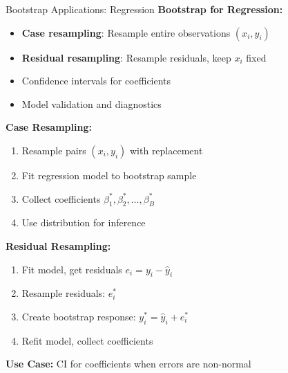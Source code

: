 \documentclass[aspectratio=169]{beamer}
\begin{document}
\begin{frame}{Bootstrap Applications: Regression}
\footnotesize
\textbf{Bootstrap for Regression:}
\begin{itemize}
    \item \textbf{Case resampling}: Resample entire observations $(x_i, y_i)$
    \item \textbf{Residual resampling}: Resample residuals, keep $x_i$ fixed
    \item Confidence intervals for coefficients
    \item Model validation and diagnostics
\end{itemize}

\vspace{0.1cm}
\textbf{Case Resampling:}
\begin{enumerate}
    \item Resample pairs $(x_i, y_i)$ with replacement
    \item Fit regression model to bootstrap sample
    \item Collect coefficients $\beta^*_1, \beta^*_2, \ldots, \beta^*_B$
    \item Use distribution for inference
\end{enumerate}

\vspace{0.1cm}
\textbf{Residual Resampling:}
\begin{enumerate}
    \item Fit model, get residuals $e_i = y_i - \hat{y}_i$
    \item Resample residuals: $e^*_i$
    \item Create bootstrap response: $y^*_i = \hat{y}_i + e^*_i$
    \item Refit model, collect coefficients
\end{enumerate}

\vspace{0.05cm}
\textbf{Use Case:} CI for coefficients when errors are non-normal
\end{frame}
\end{document}
